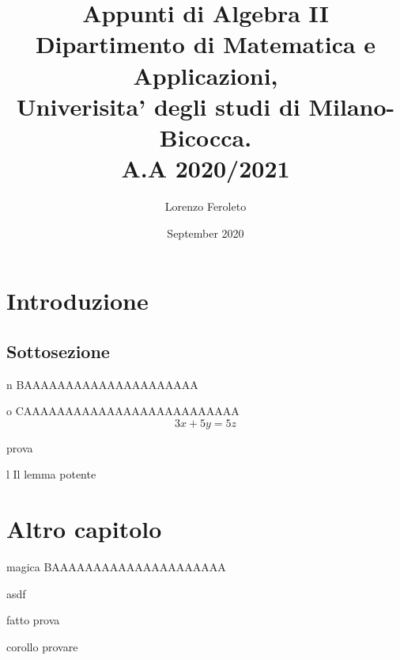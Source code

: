 \documentclass{article}
\title{
  \Large{\bf{Appunti di Algebra II}} \\
  Dipartimento di Matematica e Applicazioni,\\
  Univerisita' degli studi di Milano-Bicocca. \\
  A.A 2020/2021
}
\author{Lorenzo Feroleto}
\date{September 2020}
\begin{document}
\maketitle
\thispagestyle{empty}

\newpage
\tableofcontents
\thispagestyle{empty}

\newpage
{}

\section{Introduzione}

\subsection{Sottosezione}

\lipsum[2]

\begin{defn}{n}
BAAAAAAAAAAAAAAAAAAAAA
\end{defn}

\lipsum[3]

\begin{theo}{o}
CAAAAAAAAAAAAAAAAAAAAAAAAAA
\[3x + 5y = 5z\]
\end{theo}
\begin{dimostrazione}
prova
\end{dimostrazione}

\begin{lem}[Il lemmone]{l}
Il lemma potente
\end{lem}

\section{Altro capitolo}
\begin{defn}{magica}
  BAAAAAAAAAAAAAAAAAAAAA
\end{defn}

\begin{dimostrazione} 
asdf
\end{dimostrazione}

\begin{prop}[fatto]{fatto}
prova
\end{prop}
\begin{dimostrazione}
\lipsum[3]
\end{dimostrazione}

\begin{coroll}[corollo]{corollo}
  provare
\end{coroll}
\end{document}
